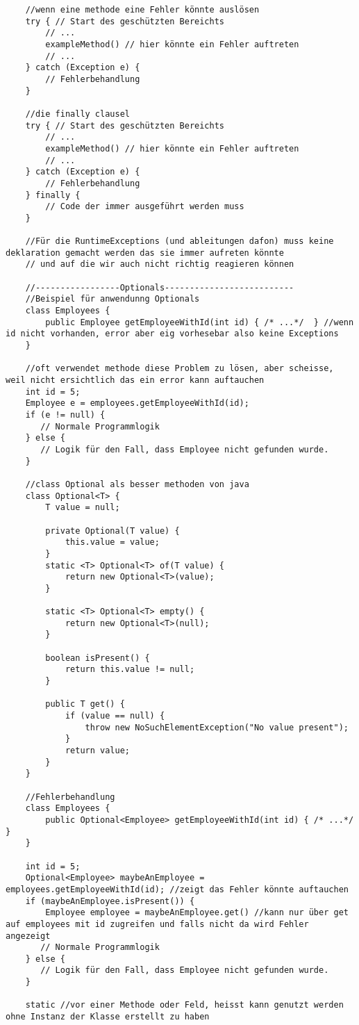 \documentclass[a4paper,12pt]{article}
\begin{document}
\begin{lstlisting}
    //wenn eine methode eine Fehler könnte auslösen
    try { // Start des geschützten Bereichts
        // ...
        exampleMethod() // hier könnte ein Fehler auftreten
        // ...
    } catch (Exception e) {
        // Fehlerbehandlung
    }

    //die finally clausel
    try { // Start des geschützten Bereichts
        // ...
        exampleMethod() // hier könnte ein Fehler auftreten
        // ...
    } catch (Exception e) {
        // Fehlerbehandlung
    } finally {
        // Code der immer ausgeführt werden muss
    }

    //Für die RuntimeExceptions (und ableitungen dafon) muss keine deklaration gemacht werden das sie immer aufreten könnte 
    // und auf die wir auch nicht richtig reagieren können

    //-----------------Optionals--------------------------
    //Beispiel für anwendunng Optionals 
    class Employees {
        public Employee getEmployeeWithId(int id) { /* ...*/  } //wenn id nicht vorhanden, error aber eig vorhesebar also keine Exceptions
    }

    //oft verwendet methode diese Problem zu lösen, aber scheisse, weil nicht ersichtlich das ein error kann auftauchen
    int id = 5;
    Employee e = employees.getEmployeeWithId(id);
    if (e != null) {
       // Normale Programmlogik
    } else {
       // Logik für den Fall, dass Employee nicht gefunden wurde. 
    }

    //class Optional als besser methoden von java 
    class Optional<T> {
        T value = null;

        private Optional(T value) {
            this.value = value;
        }
        static <T> Optional<T> of(T value) { 
            return new Optional<T>(value);
        }

        static <T> Optional<T> empty() { 
            return new Optional<T>(null);
        }

        boolean isPresent() { 
            return this.value != null;
        }

        public T get() {
            if (value == null) {
                throw new NoSuchElementException("No value present");
            }
            return value;
        }
    }

    //Fehlerbehandlung 
    class Employees {
        public Optional<Employee> getEmployeeWithId(int id) { /* ...*/  }
    }

    int id = 5;
    Optional<Employee> maybeAnEmployee = employees.getEmployeeWithId(id); //zeigt das Fehler könnte auftauchen
    if (maybeAnEmployee.isPresent()) {
        Employee employee = maybeAnEmployee.get() //kann nur über get auf employees mit id zugreifen und falls nicht da wird Fehler angezeigt
       // Normale Programmlogik
    } else {
       // Logik für den Fall, dass Employee nicht gefunden wurde. 
    }

    static //vor einer Methode oder Feld, heisst kann genutzt werden ohne Instanz der Klasse erstellt zu haben

    \end{lstlisting}
\end{document}
